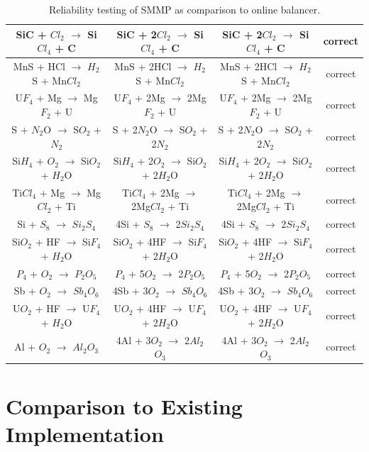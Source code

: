 \documentclass[12pt, titlepage]{article}
\begin{document}
\begin{table}[h!]
{\begin{tabular}{|c|c|c|c|}
SiC + $Cl_2$ $\rightarrow$ Si$Cl_4$ + C & SiC + 2$Cl_2$ $\rightarrow$ Si$Cl_4$ + C & SiC + 2$Cl_2$ $\rightarrow$ Si$Cl_4$ + C & correct \\ \hline
MnS + HCl $\rightarrow$ $H_2$S + Mn$Cl_2$ & MnS + 2HCl $\rightarrow$ $H_2$S + Mn$Cl_2$ & MnS + 2HCl $\rightarrow$ $H_2$S + Mn$Cl_2$ & correct  \\ \hline
 U$F_4$ + Mg $\rightarrow$ Mg$F_2$ + U & U$F_4$ + 2Mg $\rightarrow$ 2Mg$F_2$ + U &  U$F_4$ + 2Mg $\rightarrow$ 2Mg$F_2$ + U & correct  \\ \hline
S + $N_2$O $\rightarrow$ S$O_2$ + $N_2$ & S + 2$N_2$O $\rightarrow$ S$O_2$ + 2$N_2$ & S + 2$N_2$O $\rightarrow$ S$O_2$ + 2$N_2$ & correct  \\ \hline
Si$H_4$ + $O_2$ $\rightarrow$ Si$O_2$ + $H_2$O & Si$H_4$ + 2$O_2$ $\rightarrow$ Si$O_2$ + 2$H_2$O & Si$H_4$ + 2$O_2$ $\rightarrow$ Si$O_2$ + 2$H_2$O & correct  \\ \hline
Ti$Cl_4$ + Mg $\rightarrow$ Mg$Cl_2$ + Ti & Ti$Cl_4$ + 2Mg $\rightarrow$ 2Mg$Cl_2$ + Ti  & Ti$Cl_4$ + 2Mg $\rightarrow$ 2Mg$Cl_2$ + Ti & correct  \\ \hline
Si + $S_8$ $\rightarrow$ $Si_2$$S_4$ & 4Si + $S_8$ $\rightarrow$ 2$Si_2$$S_4$ & 4Si + $S_8$ $\rightarrow$ 2$Si_2$$S_4$ & correct \\ \hline
Si$O_2$ + HF $\rightarrow$ Si$F_4$ + $H_2$O & Si$O_2$ + 4HF $\rightarrow$ Si$F_4$ + 2$H_2$O & Si$O_2$ + 4HF $\rightarrow$ Si$F_4$ + 2$H_2$O & correct \\ \hline
$P_4$ + $O_2$ $\rightarrow$ $P_2$$O_5$ & $P_4$ + 5$O_2$ $\rightarrow$ 2$P_2$$O_5$ & $P_4$ + 5$O_2$ $\rightarrow$ 2$P_2$$O_5$& correct \\ \hline
Sb + $O_2$ $\rightarrow$ $Sb_4$$O_6$ & 4Sb + 3$O_2$ $\rightarrow$ $Sb_4$$O_6$ & 4Sb + 3$O_2$ $\rightarrow$ $Sb_4$$O_6$ & correct \\ \hline
U$O_2$ + HF $\rightarrow$ U$F_4$ + $H_2$O  & U$O_2$ + 4HF $\rightarrow$ U$F_4$ + 2$H_2$O  & U$O_2$ + 4HF $\rightarrow$ U$F_4$ + 2$H_2$O & correct \\ \hline
Al + $O_2$ $\rightarrow$ $Al_2$$O_3$ & 4Al + 3$O_2$ $\rightarrow$ 2$Al_2$$O_3$ & 4Al + 3$O_2$ $\rightarrow$ 2$Al_2$$O_3$ & correct  \\ \hline
\hline
\end{tabular}}
\caption{Reliability testing of SMMP as comparison to online balancer.}
\label{Reliability}
\end{table}
	
\section{Comparison to Existing Implementation}	
\end{document}
